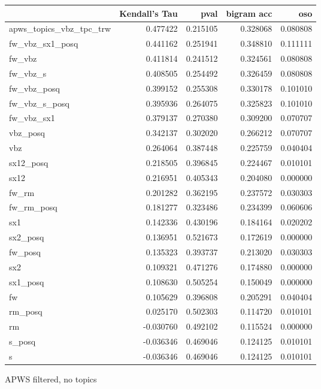 \documentclass[11pt]{article}
\begin{document}
\begin{figure*}[h]
\begin{tabular}{lrrrr}
\toprule
{} &  Kendall's Tau &      pval &  bigram acc &       oso \\
\midrule
apws\_topics\_vbz\_tpc\_trw &       0.477422 &  0.215105 &    0.328068 &  0.080808 \\
fw\_vbz\_sx1\_posq         &       0.441162 &  0.251941 &    0.348810 &  0.111111 \\
fw\_vbz                  &       0.411814 &  0.241512 &    0.324561 &  0.080808 \\
fw\_vbz\_s                &       0.408505 &  0.254492 &    0.326459 &  0.080808 \\
fw\_vbz\_posq             &       0.399152 &  0.255308 &    0.330178 &  0.101010 \\
fw\_vbz\_s\_posq           &       0.395936 &  0.264075 &    0.325823 &  0.101010 \\
fw\_vbz\_sx1              &       0.379137 &  0.270380 &    0.309200 &  0.070707 \\
vbz\_posq                &       0.342137 &  0.302020 &    0.266212 &  0.070707 \\
vbz                     &       0.264064 &  0.387448 &    0.225759 &  0.040404 \\
sx12\_posq               &       0.218505 &  0.396845 &    0.224467 &  0.010101 \\
sx12                    &       0.216951 &  0.405343 &    0.204080 &  0.000000 \\
fw\_rm                   &       0.201282 &  0.362195 &    0.237572 &  0.030303 \\
fw\_rm\_posq              &       0.181277 &  0.323486 &    0.234399 &  0.060606 \\
sx1                     &       0.142336 &  0.430196 &    0.184164 &  0.020202 \\
sx2\_posq                &       0.136951 &  0.521673 &    0.172619 &  0.000000 \\
fw\_posq                 &       0.135323 &  0.393737 &    0.213020 &  0.030303 \\
sx2                     &       0.109321 &  0.471276 &    0.174880 &  0.000000 \\
sx1\_posq                &       0.108630 &  0.505254 &    0.150049 &  0.000000 \\
fw                      &       0.105629 &  0.396808 &    0.205291 &  0.040404 \\
rm\_posq                 &       0.025170 &  0.502303 &    0.114720 &  0.010101 \\
rm                      &      -0.030760 &  0.492102 &    0.115524 &  0.000000 \\
s\_posq                  &      -0.036346 &  0.469046 &    0.124125 &  0.010101 \\
s                       &      -0.036346 &  0.469046 &    0.124125 &  0.010101 \\
\bottomrule
\end{tabular}
\caption{APWS filtered, no topics}
\end{figure*}
\end{document}

